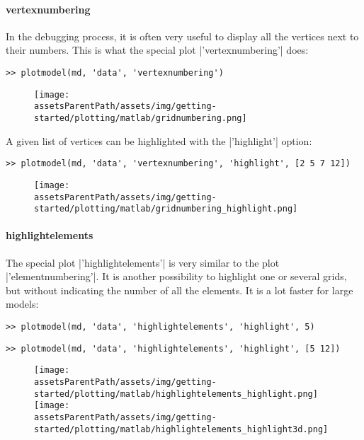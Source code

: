 \paragraph{vertexnumbering}%
In the debugging process, it is often very useful to display all the vertices next to their numbers. This is what the special plot \lstinlinebg|'vertexnumbering'| does:
\begin{lstlisting}
>> plotmodel(md, 'data', 'vertexnumbering')
\end{lstlisting}
\begin{figure}[H]
	\begin{center}
		\texttt{[image: \\assetsParentPath/assets/img/getting-started/plotting/matlab/gridnumbering.png]}
	\end{center}
\end{figure}

A given list of vertices can be highlighted with the \lstinlinebg|'highlight'| option:
\begin{lstlisting}
>> plotmodel(md, 'data', 'vertexnumbering', 'highlight', [2 5 7 12])
\end{lstlisting}
\begin{figure}[H]
	\begin{center}
		\texttt{[image: \\assetsParentPath/assets/img/getting-started/plotting/matlab/gridnumbering\_highlight.png]}
	\end{center}
\end{figure}
\paragraph{highlightelements}%
The special plot \lstinlinebg|'highlightelements'| is very similar to the plot \lstinlinebg|'elementnumbering'|. It is another possibility to highlight one or several grids, but without indicating the number of all the elements. It is a lot faster for large models:
\begin{lstlisting}
>> plotmodel(md, 'data', 'highlightelements', 'highlight', 5)
\end{lstlisting}
\begin{lstlisting}
>> plotmodel(md, 'data', 'highlightelements', 'highlight', [5 12])
\end{lstlisting}
\begin{figure}[H]
	\begin{center}
		\texttt{[image: \\assetsParentPath/assets/img/getting-started/plotting/matlab/highlightelements\_highlight.png]}
		\texttt{[image: \\assetsParentPath/assets/img/getting-started/plotting/matlab/highlightelements\_highlight3d.png]}
	\end{center}
\end{figure}
